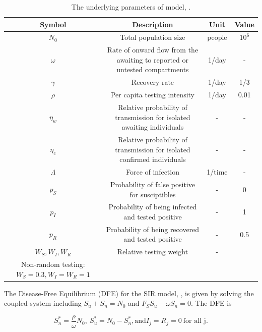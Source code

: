 \documentclass[12pt]{article}
\theoremstyle{definition} %
\begin{document}
\begin{landscape}
\begin{table}[htp]
\centering
{\tiny %
\begin{tabular}{|c|ccc|} \hline
  Symbol & Description & Unit & Value \\ \hline
  $N_0$     & Total population size & people & $10^6$ \\ \hline
  $\omega$  & Rate of onward flow from the awaiting to reported or untested compartments  & 1/day & - \\ \hline
  $\gamma$ & Recovery rate & 1/day & 1/3 \\ \hline 
  $\rho$   & Per capita testing intensity & 1/day & 0.01 \\ \hline 
  $\eta_w$  & Relative probability of transmission for isolated awaiting individuals & - & - \\ \hline
  $\eta_c$  & Relative probability of transmission for isolated confirmed individuals & - & -  \\ \hline
  $\Lambda$ & Force of infection & 1/time & - \\ \hline
  $p_S$ & Probability of false positive for susciptibles& - & 0 \\ \hline
  $p_I$ & Probability of being infected and tested positive & - & 1 \\ \hline
  $p_R$ & Probability of being recovered and tested positive & - & 0.5 \\ \hline
  $W_S, W_I, W_R$ & Relative testing weight & - & 
  \begin{minipage}[t]{0.21\columnwidth}%
 Random testing: $W_S=W_I=W_R=1$, \\Non-random testing: $W_S=0.3, W_I=W_R=1$
\end{minipage} \\ \hline

  \end{tabular}
  }%
\caption{\label{tab:params} The underlying parameters of model, .}
\end{table}
\end{landscape}
\restoregeometry


The Disease-Free Equilibrium (DFE) for the SIR model, , is given by solving the coupled system including $S_u+S_n=N_0$ and $F_S S_u-\omega S_n=0$. The DFE is

\begin{equation}
\label{dfe}
S_n^*= \frac{\rho}{\omega} N_0, \ S_u^*= N_0-S_n^*, \text{and} I_j=R_j=0 \ \text{for all j}.
\end{equation}
\end{document}
